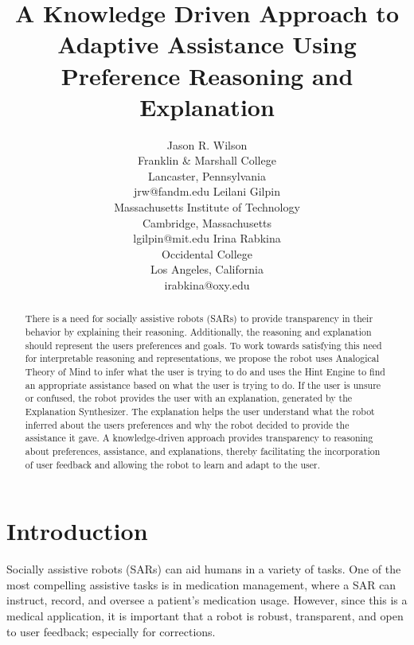 \documentclass[letterpaper]{article} %
\title{A Knowledge Driven Approach to Adaptive Assistance Using Preference Reasoning and Explanation}
\author{Jason R. Wilson\\Franklin \& Marshall College\\Lancaster, Pennsylvania\\jrw@fandm.edu \And Leilani Gilpin\\Massachusetts Institute of Technology\\Cambridge, Massachusetts\\lgilpin@mit.edu \And Irina Rabkina\\Occidental College\\Los Angeles, California\\irabkina@oxy.edu}
\begin{document}
\maketitle

\begin{abstract}
There is a need for socially assistive robots (SARs) to provide
transparency in their behavior by explaining their reasoning. Additionally,
the reasoning and explanation should represent the users preferences and
goals.
To work towards satisfying this need for interpretable
reasoning and representations, we propose the robot uses Analogical
Theory of Mind to infer what the user is trying to do and uses the
Hint Engine to find an appropriate assistance based on what the user
is trying to do.  If the user is unsure or confused, the robot
provides the user with an explanation, generated by the Explanation
Synthesizer.  The explanation helps the user understand what the robot
inferred about the users preferences and why the robot decided to
provide the assistance it gave.  A knowledge-driven approach provides
transparency to reasoning about preferences, assistance, and
explanations, thereby facilitating the incorporation
of user feedback and allowing the robot to learn and adapt to the user.
\end{abstract}

\section{Introduction}
Socially assistive robots (SARs) can aid humans in a variety of tasks.
One of the most compelling assistive tasks is in medication
management, where a SAR can instruct, record, and oversee a patient's
medication usage.  However, since this is a medical application, it is
important that a robot is robust, transparent, and open to user
feedback; especially for corrections.
\end{document}
